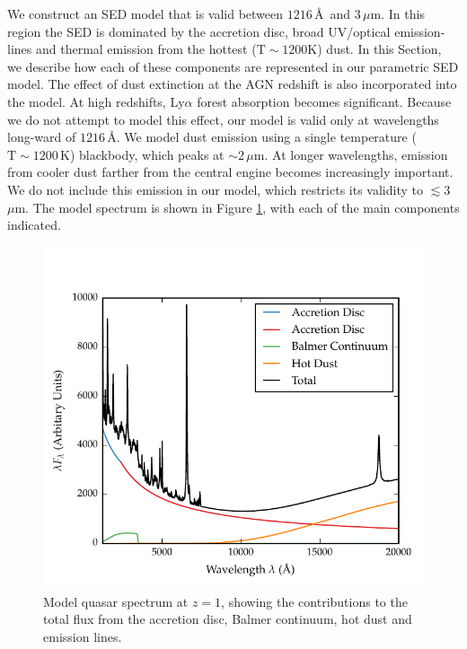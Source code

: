 We construct an SED model that is valid between $1216$\,\AA\, and $3$\,$\mu$m.
In this region the SED is dominated by the accretion disc, broad UV/optical emission-lines and thermal emission from the hottest (${\mathrm T}\sim1200$K) dust. 
In this Section, we describe how each of these components are represented in our parametric SED model.  
The effect of dust extinction at the AGN redshift is also incorporated into the model. 
At high redshifts, Ly$\alpha$ forest absorption becomes significant. 
Because we do not attempt to model this effect, our model is valid only at wavelengths long-ward of $1216$\,\AA. 
We model dust emission using a single temperature (${\mathrm T}\sim1200$\,K) blackbody, which peaks at $\sim2$\,$\mu$m. 
At longer wavelengths, emission from cooler dust farther from the central engine becomes increasingly important. 
We do not include this emission in our model, which restricts its validity to $\lesssim3$\,$\mu$m.
The model spectrum is shown in Figure \ref{fig:modelsed}, with each of the main components indicated. 

\begin{figure}[h!]
  \centering
  \includegraphics[width=\textwidth]{figures/chapter05/sed_model.pdf}
  \caption[{Model quasar spectrum at $z=1$, showing the contributions to the total flux from the accretion disc, Balmer continuum, hot dust and emission lines.}]{Model quasar spectrum at $z=1$, showing the contributions to the total flux from the accretion disc, Balmer continuum, hot dust and emission lines. }
  \label{fig:modelsed}
\end{figure}

